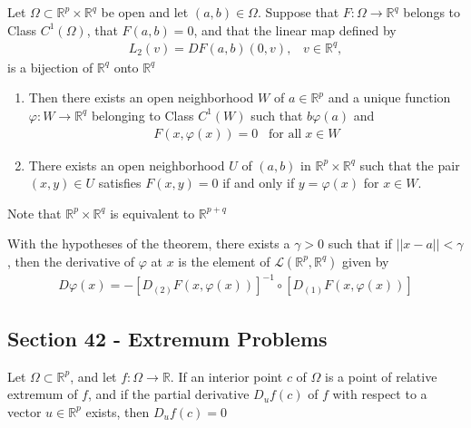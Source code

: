 \documentclass[12pt]{article}
\newcommand{\R}{\mathbb{R}}
\newenvironment{theorem}[2][Theorem]{\begin{trivlist}
\item[\hskip \labelsep {\bfseries #1}\hskip \labelsep {\bfseries #2.}]}{\end{trivlist}}
\newenvironment{corollary}[2][Corollary]{\begin{trivlist}
\item[\hskip \labelsep {\bfseries #1}\hskip \labelsep {\bfseries #2.}]}{\end{trivlist}}
\begin{document}
\begin{theorem}[Implicit Function]{Theorem}
Let $\Omega \subset \R^p \times \R^q$ be open and let $(a, b) \in \Omega$. Suppose that $F: \Omega \to \R^q$ belongs to Class $C^1(\Omega)$, that $F(a, b) = 0$, and that the linear map defined by
\begin{align*}
L_2(v) = DF(a, b)(0, v), \; \; \; v \in \R^q,
\end{align*}
is a bijection of $\R^q$ onto $\R^q$

\begin{enumerate}[label = \alph*)]
\item Then there exists an open neighborhood $W$ of $a \in \R^p$ and a unique function $\varphi: W \to \R^q$ belonging to Class $C^1(W)$ such that $b \varphi(a)$ and 
\begin{align*}
F(x, \varphi(x)) = 0 \; \; \; \text{for all} \; x \in W
\end{align*}
\item There exists an open neighborhood $U$ of $(a, b)$ in $\R^p \times \R^q$ such that the pair $(x, y) \in U$ satisfies $F(x, y) = 0$ if and only if $y = \varphi(x)$ for $x \in W$.
\end{enumerate}

Note that $\R^p \times \R^q$ is equivalent to $\R^{p+q}$
\end{theorem}

\begin{corollary}{41.10}
With the hypotheses of the theorem, there exists a $\gamma > 0$ such that if $||x - a|| < \gamma$, then the derivative of $\varphi$ at $x$ is the element of $\mathscr{L}(\R^p, \R^q)$ given by
\begin{align*}
D\varphi(x) = -[D_{(2)}F(x, \varphi(x))]^{-1} \circ [D_{(1)}F(x, \varphi(x))]
\end{align*}
\end{corollary}

\subsection*{Section 42 - Extremum Problems}

\begin{theorem}{42.1}
Let $\Omega \subset \R^p$, and let $f: \Omega \to \R$. If an interior point $c$ of $\Omega$ is a point of relative extremum of $f$, and if the partial derivative $D_uf(c)$ of $f$ with respect to a vector $u \in \R^p$ exists, then $D_uf(c) = 0$
\end{theorem}
\end{document}
